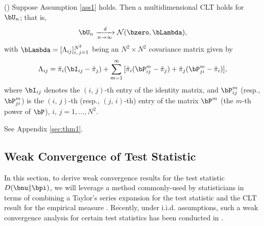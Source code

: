 \documentclass[10pt, twocolumn]{IEEEtran}
\begin{document}
\begin{lemma} \label{th1} (\cite{billingsley1961statisticala}) Suppose Assumption \ref{ass1} holds. Then a
  multidimensional CLT holds for $\bU_n$; that is,
\begin{equation}
{\bU_n}\xrightarrow[{n \to \infty }]{{\textit{d}}}\mathcal{N}( {\bzero,
    \bLambda} ), 
\label{4}
\end{equation}
with $\bLambda = [{{\Lambda _{
          {ij} }}}]_{i,\,j = 1}^{{N^2}}$ being an $N^2 \times N^2$
    covariance matrix given by 
\begin{equation} {\Lambda _{ij}} = {{\tilde \pi }_i}( {{\bI_{ij}} -
        {{\tilde \pi }_j}} ) + \sum\limits_{m = 1}^\infty {[{{\tilde \pi
          }_i}( {\bP_{ij}^m - {{\tilde \pi }_j}} ) + {{\tilde \pi }_j}(
        \bP_{ji}^m - \tilde{\pi}_i )]}, \label{8}
\end{equation} 
where ${\bI}_{ij}$ denotes the $(i,\,j)$-th entry of the identity
matrix, and ${\bP}^m_{ij}$ (resp., ${\bP}^m_{ji}$) is the $(i,\,j)$-th
(resp., $(j,\,i)$-th) entry of the matrix ${\bP}^m$ (the $m$-th power of
${\bP}$), $i,\,j=1,\ldots,N^2$.
\end{lemma}
\begin{IEEEproof}
See Appendix \ref{sec:thm1}.
\end{IEEEproof}


\subsection{Weak Convergence of Test Statistic}

In this section, to derive weak convergence results for the test
statistic ${D}( {{\bnu} \|{\bpi} } )$, we will leverage a method
commonly-used by statisticians in terms of combining a Taylor's series
expansion for the test statistic and the CLT result for the empirical
measure \cite{wilks1938large}. Recently, under i.i.d. assumptions, such
a weak convergence analysis for certain test statistics has been
conducted in \cite{unnikrishnan2011universal,TIT13}.
\end{document}

